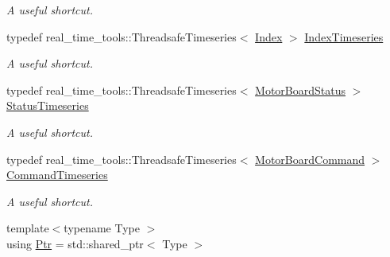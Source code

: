 \begin{DoxyCompactItemize}
\begin{DoxyCompactList}\small\item\em A useful shortcut. \end{DoxyCompactList}\item 
typedef real\+\_\+time\+\_\+tools\+::\+Threadsafe\+Timeseries$<$ \hyperlink{classblmc__drivers_1_1MotorBoardInterface_ab0e201396fe808cbc480b69768c81fa2}{Index} $>$ \hyperlink{classblmc__drivers_1_1MotorBoardInterface_aef0ca990410b130b67abce74d20d58a5}{Index\+Timeseries}\hypertarget{classblmc__drivers_1_1MotorBoardInterface_aef0ca990410b130b67abce74d20d58a5}{}\label{classblmc__drivers_1_1MotorBoardInterface_aef0ca990410b130b67abce74d20d58a5}

\begin{DoxyCompactList}\small\item\em A useful shortcut. \end{DoxyCompactList}\item 
typedef real\+\_\+time\+\_\+tools\+::\+Threadsafe\+Timeseries$<$ \hyperlink{classblmc__drivers_1_1MotorBoardStatus}{Motor\+Board\+Status} $>$ \hyperlink{classblmc__drivers_1_1MotorBoardInterface_ae3777e484dda60c4abe87f2b542ddfb8}{Status\+Timeseries}\hypertarget{classblmc__drivers_1_1MotorBoardInterface_ae3777e484dda60c4abe87f2b542ddfb8}{}\label{classblmc__drivers_1_1MotorBoardInterface_ae3777e484dda60c4abe87f2b542ddfb8}

\begin{DoxyCompactList}\small\item\em A useful shortcut. \end{DoxyCompactList}\item 
typedef real\+\_\+time\+\_\+tools\+::\+Threadsafe\+Timeseries$<$ \hyperlink{classblmc__drivers_1_1MotorBoardCommand}{Motor\+Board\+Command} $>$ \hyperlink{classblmc__drivers_1_1MotorBoardInterface_ae2afe94a023d9f08a4c689e9b7660f15}{Command\+Timeseries}\hypertarget{classblmc__drivers_1_1MotorBoardInterface_ae2afe94a023d9f08a4c689e9b7660f15}{}\label{classblmc__drivers_1_1MotorBoardInterface_ae2afe94a023d9f08a4c689e9b7660f15}

\begin{DoxyCompactList}\small\item\em A useful shortcut. \end{DoxyCompactList}\item 
{\footnotesize template$<$typename Type $>$ }\\using \hyperlink{classblmc__drivers_1_1MotorBoardInterface_a6a733b7ed7a3a96f6b0712b6bb5307f8}{Ptr} = std\+::shared\+\_\+ptr$<$ Type $>$\hypertarget{classblmc__drivers_1_1MotorBoardInterface_a6a733b7ed7a3a96f6b0712b6bb5307f8}{}\label{classblmc__drivers_1_1MotorBoardInterface_a6a733b7ed7a3a96f6b0712b6bb5307f8}


\end{DoxyCompactItemize}
